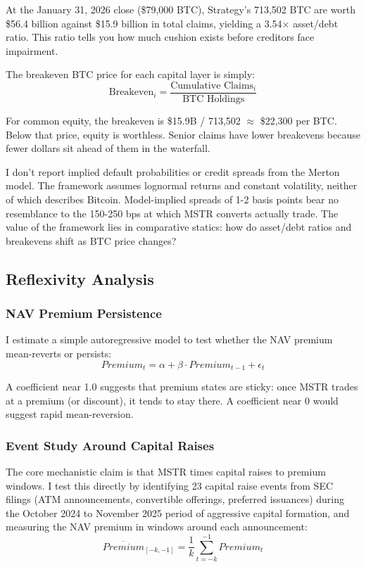 At the January 31, 2026 close (\$79,000 BTC), Strategy's 713,502 BTC are worth \$56.4 billion against \$15.9 billion in total claims, yielding a 3.54$\times$ asset/debt ratio. This ratio tells you how much cushion exists before creditors face impairment.

The breakeven BTC price for each capital layer is simply:
\begin{equation}
    \text{Breakeven}_i = \frac{\text{Cumulative Claims}_i}{\text{BTC Holdings}}
\end{equation}

For common equity, the breakeven is \$15.9B / 713,502 $\approx$ \$22,300 per BTC. Below that price, equity is worthless. Senior claims have lower breakevens because fewer dollars sit ahead of them in the waterfall.

I don't report implied default probabilities or credit spreads from the Merton model. The framework assumes lognormal returns and constant volatility, neither of which describes Bitcoin. Model-implied spreads of 1-2 basis points bear no resemblance to the 150-250 bps at which MSTR converts actually trade. The value of the framework lies in comparative statics: how do asset/debt ratios and breakevens shift as BTC price changes?

\subsection{Reflexivity Analysis}

\subsubsection{NAV Premium Persistence}

I estimate a simple autoregressive model to test whether the NAV premium mean-reverts or persists:
\begin{equation}
    Premium_t = \alpha + \beta \cdot Premium_{t-1} + \epsilon_t
\end{equation}

A coefficient near 1.0 suggests that premium states are sticky: once MSTR trades at a premium (or discount), it tends to stay there. A coefficient near 0 would suggest rapid mean-reversion.

\subsubsection{Event Study Around Capital Raises}

The core mechanistic claim is that MSTR times capital raises to premium windows. I test this directly by identifying 23 capital raise events from SEC filings (ATM announcements, convertible offerings, preferred issuances) during the October 2024 to November 2025 period of aggressive capital formation, and measuring the NAV premium in windows around each announcement:
\begin{equation}
    \overline{Premium}_{[-k, -1]} = \frac{1}{k} \sum_{t=-k}^{-1} Premium_t
\end{equation}


